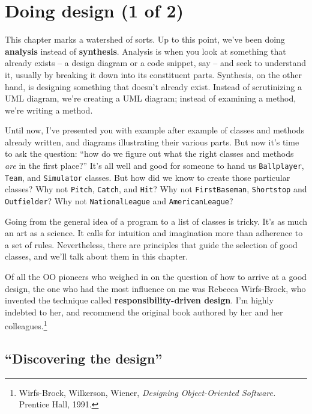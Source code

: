 
\chapter{Doing design (1 of 2)}
\label{design1}

This chapter marks a watershed of sorts. Up to this point, we've been doing
\textbf{analysis} instead of \textbf{synthesis}. Analysis is when you look at
something that already exists -- a design diagram or a code snippet, say --
and seek to understand it, usually by breaking it down into its constituent
parts. Synthesis, on the other hand, is designing something that doesn't
already exist. Instead of scrutinizing a UML diagram, we're creating a UML
diagram; instead of examining a method, we're writing a method.

Until now, I've presented you with example after example of classes and
methods already written, and diagrams illustrating their various parts. But
now it's time to ask the question: ``how do we figure out what the right
classes and methods \textit{are} in the first place?'' It's all well and good
for someone to hand us \texttt{Ballplayer}, \texttt{Team}, and
\texttt{Simulator} classes. But how did we know to create those particular
classes? Why not \texttt{Pitch}, \texttt{Catch}, and \texttt{Hit}? Why not
\texttt{FirstBaseman}, \texttt{Shortstop} and \texttt{Outfielder}? Why not
\texttt{NationalLeague} and \texttt{AmericanLeague}?

Going from the general idea of a program to a list of classes is tricky. It's
as much an art as a science. It calls for intuition and imagination more than
adherence to a set of rules. Nevertheless, there are principles that guide the
selection of good classes, and we'll talk about them in this chapter.

Of all the OO pioneers who weighed in on the question of how to arrive at a
good design, the one who had the most influence on me was Rebecca Wirfs-Brock,
who invented the technique called \textbf{responsibility-driven design}. I'm
highly indebted to her, and recommend the original book authored by her and
her colleagues.\footnote{Wirfs-Brock, Wilkerson, Wiener, \textit{Designing
Object-Oriented Software.} Prentice Hall, 1991.}

\section{``Discovering the design''}

